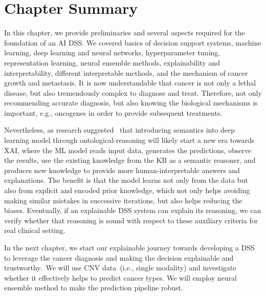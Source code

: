 \section{Chapter Summary}
In this chapter, we provide preliminaries and several aspects required for the foundation of an AI DSS. We covered basics of decision support systems, machine learning, deep learning and neural networks, hyperparameter tuning, representation learning, neural ensemble methods, explainability and interpretability, different interpretable methods, and the mechanism of cancer growth and metastasis. 
It is now understandable that cancer is not only a lethal disease, but also tremendously complex to diagnose and treat. Therefore, not only recommending accurate diagnosis, but also knowing the biological mechanisms is important, e.g., oncogenes in order to provide subsequent treatments. 

\hspace*{3.5mm} Nevertheless, as research suggested~\cite{alirezaie2019semantic} that introducing semantics into deep learning model through ontological-reasoning will likely start a new era towards XAI, where the ML model reads input data, generates the predictions, observe the results, use the existing knowledge from the KB as a semantic reasoner, and produces new knowledge to provide more human-interpretable answers and explanations. The benefit is that the model learns not only from the data but also from explicit and encoded prior knowledge, which not only helps avoiding making similar mistakes in successive iterations, but also helps reducing the biases. 
Eventually, if an explainable DSS system can explain its reasoning, we can verify whether that reasoning is sound with respect to these auxiliary criteria for real clinical setting. 

\hspace*{3.5mm}In the next chapter, we start our explainable journey towards developing a DSS to leverage the cancer diagnosis and making the decision explainable and trustworthy.~We will use CNV data~(i.e., single modality) and investigate whether it effectively helps to predict cancer types. We will employ neural ensemble method to make the prediction pipeline robust. 